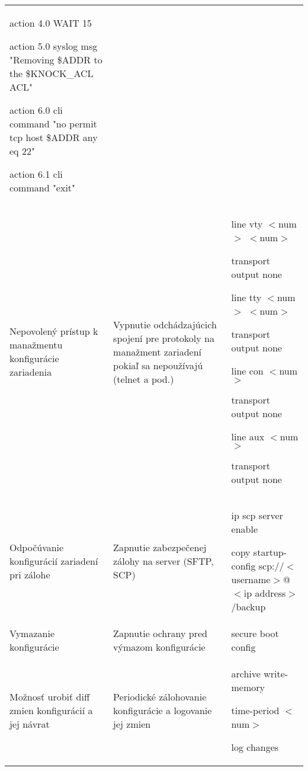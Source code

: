 \begin{longtable}[!htbp]{|L{10em}L{10em}>{\selectfont}L{34em}|}
	\hspace{0.5em}action 4.0 WAIT 15
	
	\hspace{0.5em}action 5.0 syslog msg "Removing \$ADDR to the \$KNOCK\_ACL ACL"
	
	\hspace{0.5em}action 6.0 cli command "no permit tcp host \$ADDR any eq 22"
	
	\hspace{0.5em}action 6.1 cli command "exit"\\
	
	
	
	Nepovolený prístup k manažmentu konfigurácie zariadenia	&Vypnutie odchádzajúcich spojení pre protokoly na manažment zariadení pokiaľ sa nepoužívajú (telnet a pod.)	&line vty $<$num$>$ $<$num$>$
	
	\hspace{0.5em}transport output none
	
	line tty $<$num$>$ $<$num$>$
	
	\hspace{0.5em}transport output none
	
	line con $<$num$>$
	
	\hspace{0.5em}transport output none
	
	line aux $<$num$>$
	
	\hspace{0.5em}transport output none\\
	
	
	
	
	
	Odpočúvanie konfigurácií zariadení pri zálohe	&Zapnutie zabezpečenej zálohy na server (SFTP, SCP)	&ip scp server enable
	
	copy startup-config scp://$<$username$>$@$<$ip address$>$/backup\\
	
	
	
	
	Vymazanie konfigurácie	&Zapnutie ochrany pred výmazom konfigurácie	&secure boot config\\
	
	
	
	Možnosť urobiť diff zmien konfigurácií a jej návrat	&Periodické zálohovanie konfigurácie a logovanie jej zmien	&archive
	write-memory
	
	time-period $<$num$>$
	
	log changes
	

\end{longtable}
